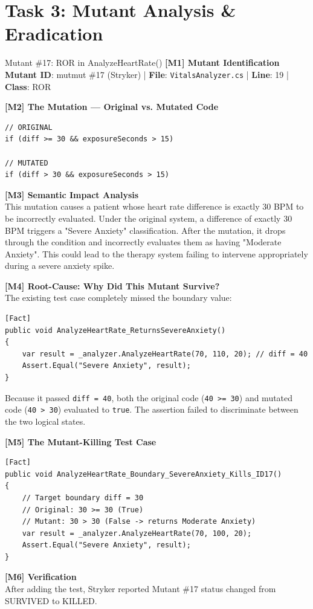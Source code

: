 \documentclass[11pt,a4paper]{article}
\begin{document}
\newpage
\section{Task 3: Mutant Analysis \& Eradication}

\begin{mutantbox}{Mutant \#17: ROR in AnalyzeHeartRate()}
\textbf{[M1] Mutant Identification}\\
\textbf{Mutant ID}: mutmut \#17 (Stryker) | \textbf{File}: \texttt{VitalsAnalyzer.cs} | \textbf{Line}: 19 | \textbf{Class}: ROR

\vspace{0.3cm}
\textbf{[M2] The Mutation — Original vs. Mutated Code}
\begin{lstlisting}[style=csharp]
// ORIGINAL
if (diff >= 30 && exposureSeconds > 15)

// MUTATED
if (diff > 30 && exposureSeconds > 15)
\end{lstlisting}

\textbf{[M3] Semantic Impact Analysis}\\
This mutation causes a patient whose heart rate difference is exactly 30 BPM to be incorrectly evaluated. Under the original system, a difference of exactly 30 BPM triggers a "Severe Anxiety" classification. After the mutation, it drops through the condition and incorrectly evaluates them as having "Moderate Anxiety". This could lead to the therapy system failing to intervene appropriately during a severe anxiety spike.

\vspace{0.3cm}
\textbf{[M4] Root-Cause: Why Did This Mutant Survive?}\\
The existing test case completely missed the boundary value:
\begin{lstlisting}[style=csharp]
[Fact]
public void AnalyzeHeartRate_ReturnsSevereAnxiety()
{
    var result = _analyzer.AnalyzeHeartRate(70, 110, 20); // diff = 40
    Assert.Equal("Severe Anxiety", result);
}
\end{lstlisting}
Because it passed \texttt{diff = 40}, both the original code (\texttt{40 >= 30}) and mutated code (\texttt{40 > 30}) evaluated to \texttt{true}. The assertion failed to discriminate between the two logical states.

\vspace{0.3cm}
\textbf{[M5] The Mutant-Killing Test Case}
\begin{lstlisting}[style=csharp]
[Fact]
public void AnalyzeHeartRate_Boundary_SevereAnxiety_Kills_ID17()
{
    // Target boundary diff = 30
    // Original: 30 >= 30 (True)
    // Mutant: 30 > 30 (False -> returns Moderate Anxiety)
    var result = _analyzer.AnalyzeHeartRate(70, 100, 20);
    Assert.Equal("Severe Anxiety", result);
}
\end{lstlisting}

\textbf{[M6] Verification}\\
After adding the test, Stryker reported Mutant \#17 status changed from SURVIVED to KILLED.
\end{mutantbox}
\end{document}
